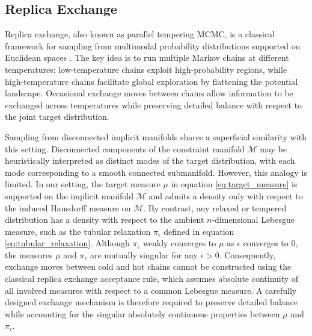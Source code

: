 \documentclass[12pt]{article}
\begin{document}
\subsection{Replica Exchange}\label{sec:pt}

Replica exchange, also known as parallel tempering MCMC, is a classical
framework for sampling from multimodal probability distributions supported on Euclidean spaces \citep{J15}. The key idea is to
run multiple Markov chains at different temperatures: low-temperature chains exploit high-probability regions, while high-temperature chains facilitate global exploration by flattening the potential landscape.
Occasional exchange moves between chains allow information to be exchanged across
temperatures while preserving detailed balance with respect to the joint target
distribution.

Sampling from disconnected implicit manifolds shares a superficial similarity
with this setting. Disconnected components of the constraint manifold
$\mathcal{M}$ may be heuristically interpreted as distinct modes of the target
distribution, with each mode corresponding to a smooth connected submanifold.
However, this analogy is limited.
In our setting, the target measure $\mu$ in equation \eqref{eq:target_measure} is supported on the
implicit manifold $\mathcal{M}$ and admits a density only with respect to the
induced Hausdorff measure on $\mathcal{M}$. By contrast, any relaxed or tempered
distribution has a density with respect to the ambient $n$-dimensional Lebesgue
measure, such as the tubular relaxation
$\pi_\epsilon$ defined in equation \eqref{eq:tubular_relaxation}. Although
$\pi_\epsilon$ weakly converges to $\mu$ as $\epsilon$ converges to 0, the measures $\mu$ and $\pi_\epsilon$ are mutually
singular for
any $\epsilon>0$. Consequently, exchange moves between cold and hot chains cannot be
constructed using the classical replica exchange acceptance rule, which
assumes absolute continuity of all involved measures with respect to a common Lebesgue measure. A carefully designed exchange mechanism is therefore required
to preserve detailed balance while accounting for the
singular absolutely continuous properties between $\mu$ and $\pi_\epsilon$.
\end{document}
